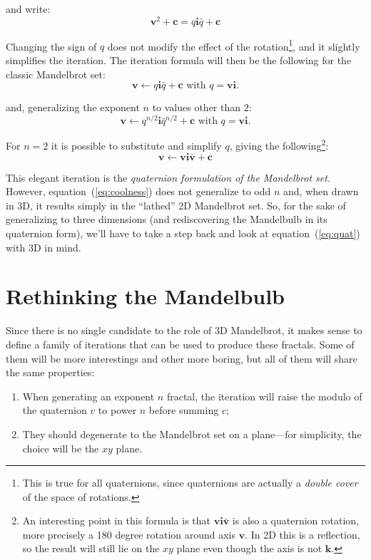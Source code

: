\documentclass{article}
\let\vec\mathbf
\begin{document}
\noindent
and write:
\begin{equation*}
\vec{v}^2+\vec{c}=q \vec{i} \bar q+\vec{c}
\end{equation*}

\noindent
Changing the sign of $q$ does not modify the effect of the
rotation\footnote{This is true for all quaternions, since quaternions
  are actually a \emph{double cover} of the space of rotations.}, and
it slightly simplifies the iteration.  The iteration formula will then be
the following for the classic Mandelbrot set:
\begin{equation*}
\vec{v}\leftarrow q \vec{i} \bar q+\vec{c}\text{ with }q=\vec{v}\vec{i}.
\end{equation*}

\noindent
and, generalizing the exponent $n$ to values other than $2$:
\begin{equation}
\label{eq:quat}
\vec{v}\leftarrow q^{n/2} \vec{i} \bar q^{n/2}+\vec{c}\text{ with }q=\vec{v}\vec{i}.
\end{equation}

\noindent
For $n=2$ it is possible to substitute and simplify $q$, giving
the following\footnote{An interesting point in this formula is that
  $\vec{v}\vec{i}\vec{\bar v}$ is also a quaternion rotation, more
  precisely a 180 degree rotation around axis $\vec{v}$.  In 2D this
  is a reflection, so the result will still lie on the $xy$ plane
  even though the axis is not $\vec{k}$.}:
\begin{equation}
\label{eq:coolness}
\vec{v}\leftarrow\vec{v} \vec{i} \vec{\bar v}+\vec{c}
\end{equation}

\noindent
This elegant iteration is the \emph{quaternion formulation of the
  Mandelbrot set}.  However, equation~(\ref{eq:coolness}) does not
generalize to odd $n$ and, when drawn in 3D, it results simply in the
``lathed'' 2D Mandelbrot set.  So, for the sake of generalizing to
three dimensions (and rediscovering the Mandelbulb in its quaternion
form), we'll have to take a step back and look at
equation~(\ref{eq:quat}) with 3D in mind.

\section{Rethinking the Mandelbulb}

Since there is no single candidate to the role of 3D Mandelbrot, it
makes sense to define a family of iterations that can be used to produce
these fractals.  Some of them will be more interestings and other more
boring, but all of them will share the same properties:
\begin{enumerate}
\item When generating an exponent $n$ fractal, the iteration will
  raise the modulo of the quaternion $v$ to power $n$ before summing
  $c$;

\item\label{item:mandel-xy} They should degenerate to the Mandelbrot
  set on a plane---for simplicity, the choice will be the $xy$ plane.
\end{enumerate}
\end{document}
